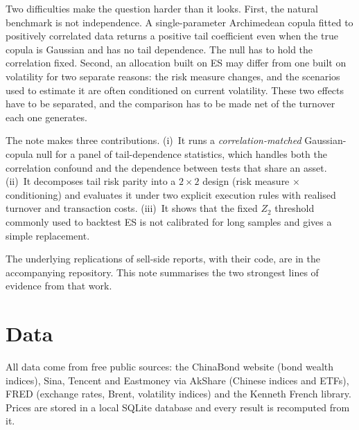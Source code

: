 \documentclass[11pt]{article}
\newcommand{\1}{\mathbf{1}}
\begin{document}
Two difficulties make the question harder than it looks. First, the natural benchmark is not independence.
A single-parameter Archimedean copula fitted to positively correlated data returns a positive tail coefficient
even when the true copula is Gaussian and has no tail dependence. The null has to hold the correlation fixed.
Second, an allocation built on ES may differ from one built on volatility for two separate reasons: the risk
measure changes, and the scenarios used to estimate it are often conditioned on current volatility. These two
effects have to be separated, and the comparison has to be made net of the turnover each one generates.

The note makes three contributions. (i)~It runs a \emph{correlation-matched} Gaussian-copula null for a
panel of tail-dependence statistics, which handles both the correlation confound and the dependence between
tests that share an asset. (ii)~It decomposes tail risk parity into a $2\times 2$ design (risk measure $\times$
conditioning) and evaluates it under two explicit execution rules with realised turnover and transaction
costs. (iii)~It shows that the fixed $Z_2$ threshold commonly used to backtest ES is not calibrated for long
samples and gives a simple replacement.

The underlying replications of sell-side reports, with their code, are in the accompanying repository. This
note summarises the two strongest lines of evidence from that work.

\section{Data}

All data come from free public sources: the ChinaBond website (bond wealth indices), Sina, Tencent and
Eastmoney via AkShare (Chinese indices and ETFs), FRED (exchange rates, Brent, volatility indices) and the
Kenneth French library. Prices are stored in a local SQLite database and every result is recomputed from it.
\end{document}
